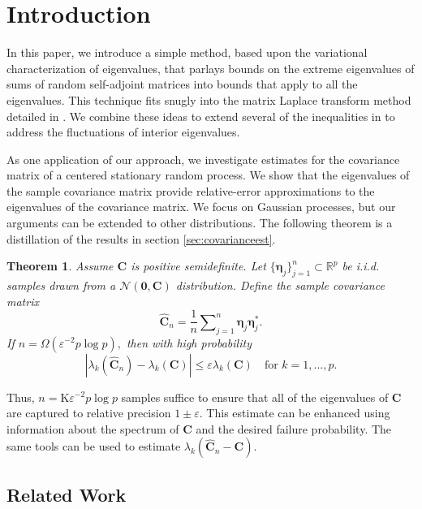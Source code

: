 \documentclass[11pt,letterpaper,twoside,reqno,nosumlimits]{amsart}
\renewcommand{\star}{*}
\newcommand{\mat}[1]{\ensuremath{\bm{#1}}} %
\renewcommand{\vec}[1]{\ensuremath{\bm{#1}}}
\newcommand{\R}{\ensuremath{\mathbb{R}}}
\newtheorem{thm}{Theorem}
\theoremstyle{remark}
\numberwithin{equation}{section}
\numberwithin{thm}{section}
\numberwithin{prop}{section}
\numberwithin{defn}{section}
\numberwithin{remark}{section}
\begin{document}
\maketitle

\section{Introduction}
In this paper, we introduce a simple method, based upon the variational characterization of eigenvalues, that parlays bounds on the extreme eigenvalues of sums of random self-adjoint matrices into bounds that apply to all the eigenvalues. This technique fits snugly into the matrix Laplace transform method detailed in \cite{T10a}. We combine these ideas to extend several of the inequalities in \cite{T10a} to address the fluctuations of interior eigenvalues. 

As one application of our approach, we investigate estimates for the covariance matrix of a centered stationary random process. We show that the eigenvalues of the sample covariance matrix provide relative-error approximations to the eigenvalues of the covariance matrix. We focus on Gaussian processes, but our arguments can be extended to other distributions. The following theorem is a distillation of the results in section \ref{sec:covarianceest}.
\begin{thm}
Assume $\mat{C}$ is positive semidefinite. Let $\{\vec{\eta}_j\}_{j=1}^n \subset \R^p$ be i.i.d. samples drawn from a $\mathcal{N}(\vec{0}, \mat{C})$ distribution. Define the sample covariance matrix
\[
\widehat{\mat{C}}_n = \frac{1}{n} \sum\nolimits_{j=1}^n \vec{\eta}_j\vec{\eta}_j^\star.
\]
If $n = \Omega(\varepsilon^{-2} p \log p),$ then with high probability
\[
|\lambda_k(\widehat{\mat{C}}_n) - \lambda_k(\mat{C})| \leq \varepsilon \lambda_k(\mat{C}) \quad \text{for } k=1, \ldots,p.
\]
\label{thm:examplecovarest}
\end{thm}
Thus, $n = \mathrm{K} \varepsilon^{-2} p \log p$ samples suffice to ensure that all of the eigenvalues of $\mat{C}$ are captured to relative precision $1 \pm \varepsilon.$ This estimate can be enhanced using information about the spectrum of $\mat{C}$ and the desired failure probability. The same tools can be used to estimate $\lambda_k(\widehat{\mat{C}}_n - \mat{C}).$

\subsection{Related Work}
\end{document}
